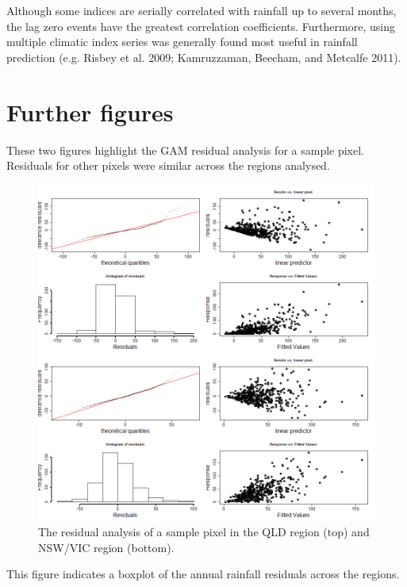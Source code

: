 \documentclass[fleqn,10pt,lineno]{wlpeerj} %
\theoremstyle{definition}
\theoremstyle{definition}
\theoremstyle{definition}
\theoremstyle{remark}
\begin{document}
Although some indices are serially correlated with rainfall up to
several months, the lag zero events have the greatest correlation
coefficients. Furthermore, using multiple climatic index series was
generally found most useful in rainfall prediction (e.g. Risbey et al.
2009; Kamruzzaman, Beecham, and Metcalfe 2011).

\newpage

\section{Further figures}\label{further-figures}

These two figures highlight the GAM residual analysis for a sample
pixel. Residuals for other pixels were similar across the regions
analysed.

\begin{figure}
\includegraphics[width=0.9\linewidth]{figures/gam_check} \caption{The residual analysis of a sample pixel in the QLD region (top) and NSW/VIC region (bottom).}\label{fig:residuals}
\end{figure}

This figure indicates a boxplot of the annual rainfall residuals across
the regions.
\end{document}
